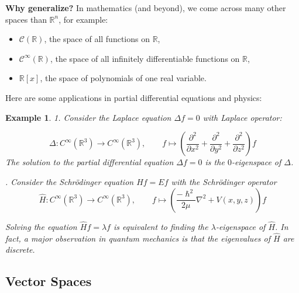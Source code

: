 \documentclass[11pt]{article}
\newtheorem{example}[theorem]{Example}
\begin{document}
{\bf Why generalize?} In mathematics (and beyond), we come across many other spaces than $\mathbb{R}^n$, for example:
\begin{itemize}
\item \(\mathcal{C}\left( \mathbb{R}\right)\), the space of all functions on \(\mathbb{R}\),
\item \({\mathcal{C}}^{\infty }\left( \mathbb{R}\right)\), the space of all infinitely differentiable functions on \(\mathbb{R}\),
\item \(\mathbb{R}[x]\), the space of polynomials of one real variable.
\end{itemize}

Here are some applications in partial differential equations and physics:
\begin{example}
1. Consider the Laplace equation \({\Delta f} = 0\) with Laplace operator:

\[
\Delta  : {C}^{\infty }\left( {\mathbb{R}}^{3}\right)  \rightarrow  {C}^{\infty }\left( {\mathbb{R}}^{3}\right), \quad \quad f \mapsto  \left( {\frac{{\partial }^2}{\partial {x}^2} + \frac{{\partial }^2}{\partial {y}^2} + \frac{{\partial }^2}{\partial {z}^2}}\right) f
\]
The solution to the partial differential equation \({\Delta f} = 0\) is the $0$-eigenspace of \(\Delta\).

. Consider the Schrödinger equation \(\widehat{H}f = {Ef}\) with the Schrödinger operator
\[
\widehat{H} : {C}^{\infty }\left( {\mathbb{R}}^{3}\right)  \rightarrow  {C}^{\infty }\left( {\mathbb{R}}^{3}\right),\quad \quad f \mapsto  \left(  {\frac{-{\hslash }^2}{2\mu }{\nabla }^2 + V\left( {x,y,z}\right) }\right)  f
\]

Solving the equation \(\widehat{H}f = \lambda f\) is equivalent to finding the $\lambda$-eigenspace of \(\widehat{H}\). In fact, a major observation in quantum mechanics is that the eigenvalues of \(\widehat{H}\) are discrete.    
\end{example}


\subsection{Vector Spaces}
\end{document}
